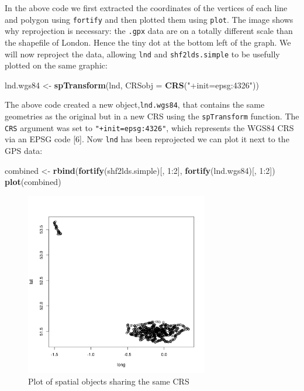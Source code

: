 \documentclass[]{article}
\newenvironment{Shaded}{}{}
\newcommand{\KeywordTok}[1]{\textcolor[rgb]{0.00,0.44,0.13}{\textbf{{#1}}}}
\newcommand{\DataTypeTok}[1]{\textcolor[rgb]{0.56,0.13,0.00}{{#1}}}
\newcommand{\DecValTok}[1]{\textcolor[rgb]{0.25,0.63,0.44}{{#1}}}
\newcommand{\StringTok}[1]{\textcolor[rgb]{0.25,0.44,0.63}{{#1}}}
\newcommand{\NormalTok}[1]{{#1}}
\let\Oldincludegraphics\includegraphics
\renewcommand{\includegraphics}[1]{\Oldincludegraphics[width=8cm]{#1}}
\begin{document}
In the above code we first extracted the coordinates of the vertices of
each line and polygon using \texttt{fortify} and then plotted them using
\texttt{plot}. The image shows why reprojection is necessary: the
\texttt{.gpx} data are on a totally different scale than the shapefile
of London. Hence the tiny dot at the bottom left of the graph. We will
now reproject the data, allowing \texttt{lnd} and
\texttt{shf2lds.simple} to be usefully plotted on the same graphic:

\begin{Shaded}
\begin{Highlighting}[]
\NormalTok{lnd.wgs84 <- }\KeywordTok{spTransform}\NormalTok{(lnd, }\DataTypeTok{CRSobj =} \KeywordTok{CRS}\NormalTok{(}\StringTok{"+init=epsg:4326"}\NormalTok{))}
\end{Highlighting}
\end{Shaded}
The above code created a new object,\texttt{lnd.wgs84}, that contains
the same geometries as the original but in a new CRS using the
\texttt{spTransform} function. The \texttt{CRS} argument was set to
\texttt{"+init=epsg:4326"}, which represents the WGS84 CRS via an EPSG
code {[}6{]}. Now \texttt{lnd} has been reprojected we can plot it next
to the GPS data:

\begin{Shaded}
\begin{Highlighting}[]
\NormalTok{combined <- }\KeywordTok{rbind}\NormalTok{(}\KeywordTok{fortify}\NormalTok{(shf2lds.simple)[, }\DecValTok{1}\NormalTok{:}\DecValTok{2}\NormalTok{], }\KeywordTok{fortify}\NormalTok{(lnd.wgs84)[, }\DecValTok{1}\NormalTok{:}\DecValTok{2}\NormalTok{])}
\KeywordTok{plot}\NormalTok{(combined)}
\end{Highlighting}
\end{Shaded}
\begin{figure}[htbp]
\centering
\includegraphics{figure/Plot_of_spatial_objects_sharing_the_same_CRS.png}
\caption{Plot of spatial objects sharing the same CRS}
\end{figure}
\end{document}
